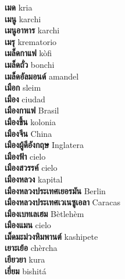 \textbf{ เมด  } kria \\
\textbf{ เมนู  } karchi \\
\textbf{ เมนูอาหาร  } karchi \\
\textbf{ เมรุ  } krematorio \\
\textbf{ เมล็ดกาแฟ  } kòfi \\
\textbf{ เมล็ดถั่ว  } bonchi \\
\textbf{ เมล็ดอัลมอนด์  } amandel \\
\textbf{ เมือก  } sleim \\
\textbf{ เมือง  } ciudad \\
\textbf{ เมืองกาแฟ  } Brasil \\
\textbf{ เมืองขึ้น  } kolonia \\
\textbf{ เมืองจีน  } China \\
\textbf{ เมืองผู้ดีอังกฤษ  } Inglatera \\
\textbf{ เมืองฟ้า  } cielo \\
\textbf{ เมืองสวรรค์  } cielo \\
\textbf{ เมืองหลวง  } kapital \\
\textbf{ เมืองหลวงประเทศเยอรมัน  } Berlin \\
\textbf{ เมืองหลวงประเทศเวเนซูเอลา  } Caracas \\
\textbf{ เมืองเบทเลเฮม  } Bètlehèm \\
\textbf{ เมืองแมน  } cielo \\
\textbf{ เม็ดมะม่วงหิมพานต์  } kashipete \\
\textbf{ เยาะเย้อ  } chèrcha \\
\textbf{ เยียวยา  } kura \\
\textbf{ เยี่ยม  } bishitá \\
